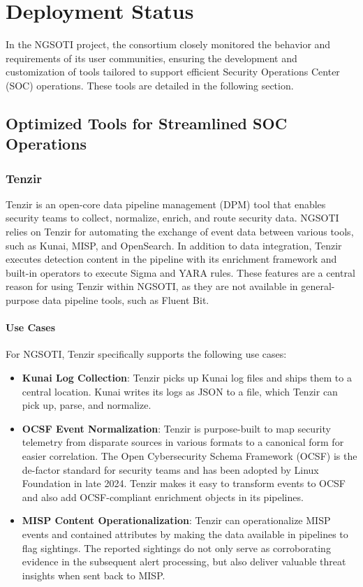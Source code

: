 \chapter{Deployment Status}

In the NGSOTI project, the consortium closely monitored the behavior and requirements of its user communities, ensuring the development and customization of tools tailored to support efficient Security Operations Center (SOC) operations. These tools are detailed in the following section.

\section{Optimized Tools for Streamlined SOC Operations}

\subsection{Tenzir}

Tenzir is an open-core data pipeline management (DPM) tool that enables security
teams to collect, normalize, enrich, and route security data. NGSOTI relies on
Tenzir for automating the exchange of event data between various tools, such as
Kunai, MISP, and OpenSearch. In addition to data integration, Tenzir executes
detection content in the pipeline with its enrichment framework and built-in
operators to execute Sigma and YARA rules. These features are a central reason
for using Tenzir within NGSOTI, as they are not available in general-purpose
data pipeline tools, such as Fluent Bit.

\subsubsection{Use Cases}

For NGSOTI, Tenzir specifically supports the following use cases:

\begin{itemize}
\item \textbf{Kunai Log Collection}: Tenzir picks up Kunai log files and ships
	them to a central location. Kunai writes its logs as JSON to a file,
	which Tenzir can pick up, parse, and normalize.
\item \textbf{OCSF Event Normalization}: Tenzir is purpose-built to map security
	telemetry from disparate sources in various formats to a canonical form
	for easier correlation. The Open Cybersecurity Schema Framework (OCSF)
	is the de-factor standard for security teams and has been adopted by
	Linux Foundation in late 2024. Tenzir makes it easy to transform events
	to OCSF and also add OCSF-compliant enrichment objects in its pipelines.
\item \textbf{MISP Content Operationalization}: Tenzir can operationalize MISP
	events and contained attributes by making the data available in
	pipelines to flag sightings. The reported sightings do not only serve as
	corroborating evidence in the subsequent alert processing, but also
	deliver valuable threat insights when sent back to MISP.
\end{itemize}

